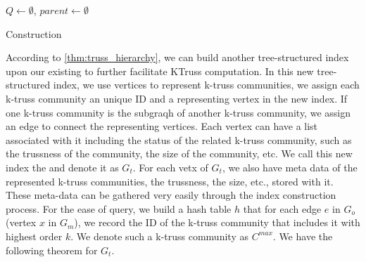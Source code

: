 \begin{algorithm}
	\BlankLine
	$Q \gets \emptyset$, $parent \gets \emptyset$\;
	\caption{\Treeindex{} Construction}\label{alg:\treeindex{}_construction}
\end{algorithm}

According to \autoref{thm:truss_hierarchy}, we can build another tree-structured index upon our existing \inducedgraph{} to further facilitate KTruss computation. In this new tree-structured index, we use vertices to represent k-truss communities, \ie we assign each k-truss community an unique ID and a representing vertex in the new index. If one k-truss community is the subgraqh of another k-truss community, we assign an edge to connect the representing vertices. Each vertex can have a list associated with it including the status of the related k-truss community, such as the trussness of the community, the size of the community, etc. We call this new index the \treeindex{} and denote it as $G_t$. For each vetx of $G_t$, we also have meta data of the represented k-truss communities, \eg the trussness, the size, etc., stored with it. These meta-data can be gathered very easily through the index construction process. For the ease of query, we build a hash table $h$ that for each edge $e$ in $G_o$ (vertex $x$ in $G_m$), we record the ID of the k-truss community that includes it with highest order $k$. We denote such a k-truss community as $C^{max}$. We have the following theorem for $G_t$.


